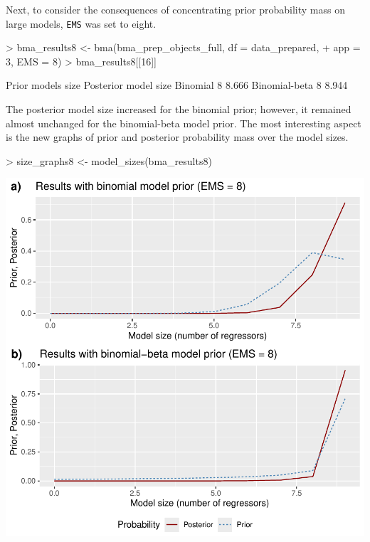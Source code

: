 \documentclass[a4paper]{article}
\begin{document}
Next, to consider the consequences of concentrating prior probability mass on large models, \verb+EMS+ was set to eight.
\begin{Schunk}
\begin{Sinput}
> bma_results8 <- bma(bma_prep_objects_full, df = data_prepared,
+                     app = 3, EMS = 8)
> bma_results8[[16]]
\end{Sinput}
\begin{Soutput}
              Prior models size Posterior model size
Binomial                      8                8.666
Binomial-beta                 8                8.944
\end{Soutput}
\end{Schunk}
The posterior model size increased for the binomial prior; however, it remained almost unchanged for the binomial-beta model prior.
The most interesting aspect is the new graphs of prior and posterior probability mass over the model sizes.
\begin{Schunk}
\begin{Sinput}
> size_graphs8 <- model_sizes(bma_results8)
\end{Sinput}
\end{Schunk}
\includegraphics{bdsm_vignette-034}
\end{document}
